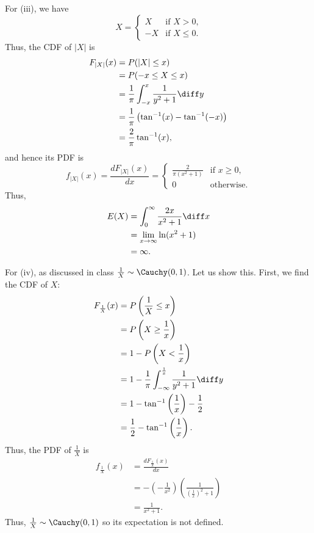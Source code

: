 \begin{solution}
  For (iii), we have
  \[
    X=
    \begin{cases}
      X&\text{if \(X>0\),}\\
      -X&\text{if \(X\leq 0\).}
    \end{cases}
  \]
  Thus, the CDF of \(|X|\) is
  \begin{align*}
    F_{|X|}(x)
    &=P(|X|\leq x)\\
    &=P(-x\leq X\leq x)\\
    &=\frac{1}{\pi}\int_{-x}^x\frac{1}{y^2+1}\diff y\\
    &=\frac{1}{\pi}\left(\tan^{-1}(x)-\tan^{-1}(-x)\right)\\
    &=\frac{2}{\pi}\tan^{-1}(x),
  \end{align*}
  and hence its PDF is
  \[
    f_{|X|}(x)=%
    \frac{dF_{|X|}(x)}{dx}=%
    \begin{cases}
      \frac{2}{\pi(x^2+1)}&\text{if \(x\geq 0\),}\\
      0&\text{otherwise.}
    \end{cases}
  \]
  Thus,
  \begin{align*}
    E(X)&=\int_0^\infty \frac{2x}{x^2+1}\diff x\\
        &=\lim_{x\to\infty}\ln(x^2+1)\\
        &=\infty.
  \end{align*}

  For (iv), as discussed in class \(\frac{1}{X}\sim\Cauchy(0,1)\). Let us
  show this. First, we find the CDF of \(X\):
  \begin{align*}
    F_{\frac{1}{X}}(x)
    &=P\left(\frac{1}{X}\leq x\right)\\
    &=P\left(X\geq\frac{1}{x}\right)\\
    &=1-P\left(X<\frac{1}{x}\right)\\
    &=1-\frac{1}{\pi}\int_{-\infty}^{\frac{1}{x}}\frac{1}{y^2+1}\diff y\\
    &=1-\tan^{-1}\left(\frac{1}{x}\right)-\frac{1}{2}\\
    &=\frac{1}{2}-\tan^{-1}\left(\frac{1}{x}\right).
  \end{align*}
  Thus, the PDF of \(\frac{1}{X}\) is
  \begin{align*}
    f_{\frac{1}{X}}(x)
    &=\frac{dF_{\frac{1}{X}}(x)}{dx}\\
    &=-\left(-\frac{1}{x^2}\right)\left(\frac{1}{\left(\frac{1}{x}\right)^2+1}\right)\\
    &=\frac{1}{x^2+1}.
  \end{align*}
  Thus, \(\frac{1}{X}\sim\Cauchy(0,1)\) so its expectation is not defined.


\end{solution}
